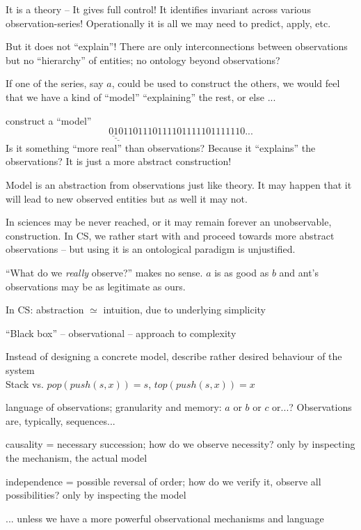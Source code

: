 \documentclass[10pt]{article}
\begin{document}
\begin{enu}
\begin{enu}
It is a theory -- It gives full control! It identifies invariant across various
observation-series! Operationally it is all we may need to predict, apply, etc.
\item But it does not ``explain''! There are only interconnections between
observations but no ``hierarchy'' of entities; no ontology beyond
observations?
\item If one of the series, say $a$, could be used to construct the others, we
would feel that we have a kind of ``model'' ``explaining'' the rest, or else ...
\item\label{mod} construct a ``model'' 
\[\underline{\underline{\underline{01}0}1}101110111101111101111110...\]
Is it something ``more real'' than observations? Because it ``explains'' the
observations? It is just a more abstract construction!
\item Model is an abstraction from observations just like theory. It may
happen that it will lead to new observed entities but as well it may not.
\end{enu}
\item In sciences  may be never reached, or it may remain forever
an unobservable, construction. In CS, we rather start with  and
proceed towards more abstract observations -- but using it is an ontological
paradigm is unjustified.
\item ``What do we {\em really} observe?'' makes no sense. $a$ is as good as
$b$ and ant's observations may be as legitimate as ours.
\item In CS: abstraction $\simeq$ intuition, due to underlying simplicity
\begin{enu}
\item ``Black box'' -- observational -- approach to complexity
\item Instead of designing a concrete model, describe rather desired
behaviour of the system\\
Stack vs. $pop(push(s,x))=s$, $top(push(s,x))=x$
\item language of observations; granularity and memory: $a$ or $b$ or $c$
or...? Observations are, typically, sequences...
\item causality = necessary succession; how do we observe necessity? only by
inspecting the mechanism, the actual model
\item independence = possible reversal of order; how do we verify it, observe all
possibilities? only by inspecting the model
\item[{...}] unless we have a more powerful observational mechanisms and language

\end{enu}
\end{enu}
\end{document}
